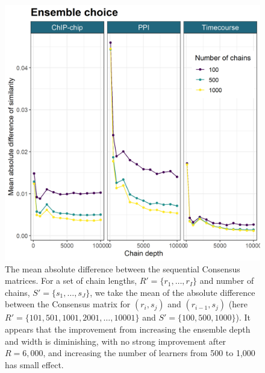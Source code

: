 \documentclass{bioinfo}
\begin{document}
\begin{figure}
	\centering
	\includegraphics[scale=0.5]{./SupplementaryMaterial/Images/Yeast/EnsembleChoicePlotAlt.png}
	\caption{The mean absolute difference between the sequential Consensus matrices. For a set of chain lengths, $R'=\{r_1, \ldots, r_I\}$ and number of chains, $S'=\{s_1, \ldots, s_J\}$, we take the mean of the absolute difference between the Consensus matrix for $(r_i, s_j)$ and $(r_{i-1}, s_{j})$ (here $R'=\{101, 501, 1001, 2001, \ldots, 10001\}$ and $S'=\{100, 500, 1000\}$). 
		It appears that the improvement from increasing the ensemble depth and width is diminishing, with no strong improvement after $R=6,000$, and increasing the number of learners from 500 to 1,000 has small effect.}
	\label{fig:ensembleChoice}
\end{figure}
\end{document}
